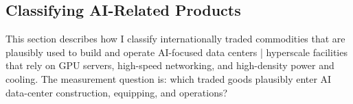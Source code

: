\documentclass[12pt,pdftex]{article}
\begin{document}
\begin{onehalfspacing}


\section{Classifying AI-Related Products}\label{sec:measurment}

This section describes how I classify internationally traded commodities that are plausibly used to build and operate AI-focused data centers | hyperscale facilities that rely on GPU servers, high-speed networking, and high-density power and cooling. The measurement question is: which traded goods plausibly enter AI data-center construction, equipping, and operations?


\end{onehalfspacing}
\end{document}
